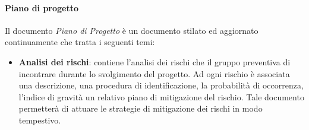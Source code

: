 \paragraph{Piano di progetto}
Il documento \textit{Piano di Progetto} è un documento stilato ed aggiornato continuamente che tratta i seguenti temi:
\begin{itemize}
    \item \textbf{Analisi dei rischi}: contiene l'analisi dei rischi che il gruppo preventiva di incontrare durante lo svolgimento del progetto. Ad ogni rischio è associata una descrizione, una procedura di identificazione, la probabilità di occorrenza, l'indice di gravità un relativo piano di mitigazione del rischio. Tale documento permetterà di attuare le strategie di mitigazione dei rischi in modo tempestivo.
\end{itemize}